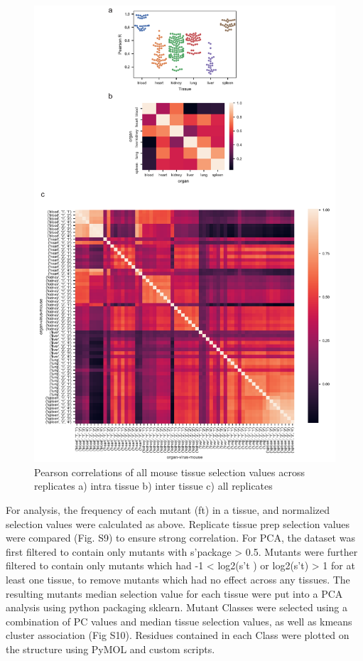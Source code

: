\begin{figure}
\includegraphics[width=\textwidth,height=\textheight,keepaspectratio]{figures/20190610AAV2_sup_figx_mouse_tissue_data_correalation.pdf} 
\caption[Pearson correlations of all mouse tissue selection values across replicates]{Pearson correlations of all mouse tissue selection values across replicates a) intra tissue b) inter tissue c) all replicates
\label{fig:Figure 10}}
\end{figure}

For analysis, the frequency of each mutant (ft) in a tissue, and normalized selection values were calculated as above. Replicate tissue prep selection values were compared (Fig. S9) to ensure strong correlation. For PCA, the dataset was first filtered to contain only mutants with s’package > 0.5. Mutants were further filtered to contain only mutants which had -1 < log2(s’t ) or log2(s’t) > 1 for at least one tissue, to remove mutants which had no effect across any tissues. The resulting mutants median selection value for each tissue were put into a PCA analysis using python packaging sklearn. Mutant Classes were selected using a combination of PC values and median tissue selection values, as well as kmeans cluster association (Fig S10). Residues contained in each Class were plotted on the structure using PyMOL and custom scripts. 



